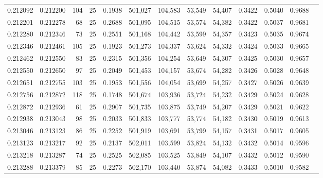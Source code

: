 \begin{tabular}{rrrrrrrrrrrrr}
0.212092 & 0.212200 &   104 &  25 &                                     0.1938 & 501,027 & 104,583 &  53,549 &  54,407 & 0.3422 & 0.5040 & 0.9688 \\
0.212201 & 0.212278 &    68 &  25 &                                     0.2688 & 501,095 & 104,515 &  53,574 &  54,382 & 0.3422 & 0.5037 & 0.9681 \\
0.212280 & 0.212346 &    73 &  25 &                                     0.2551 & 501,168 & 104,442 &  53,599 &  54,357 & 0.3423 & 0.5035 & 0.9674 \\
0.212346 & 0.212461 &   105 &  25 &                                     0.1923 & 501,273 & 104,337 &  53,624 &  54,332 & 0.3424 & 0.5033 & 0.9665 \\
0.212462 & 0.212550 &    83 &  25 &                                     0.2315 & 501,356 & 104,254 &  53,649 &  54,307 & 0.3425 & 0.5030 & 0.9657 \\
0.212550 & 0.212650 &    97 &  25 &                                     0.2049 & 501,453 & 104,157 &  53,674 &  54,282 & 0.3426 & 0.5028 & 0.9648 \\
0.212651 & 0.212755 &   103 &  25 &                                     0.1953 & 501,556 & 104,054 &  53,699 &  54,257 & 0.3427 & 0.5026 & 0.9639 \\
0.212756 & 0.212872 &   118 &  25 &                                     0.1748 & 501,674 & 103,936 &  53,724 &  54,232 & 0.3429 & 0.5024 & 0.9628 \\
0.212872 & 0.212936 &    61 &  25 &                                     0.2907 & 501,735 & 103,875 &  53,749 &  54,207 & 0.3429 & 0.5021 & 0.9622 \\
0.212938 & 0.213043 &    98 &  25 &                                     0.2033 & 501,833 & 103,777 &  53,774 &  54,182 & 0.3430 & 0.5019 & 0.9613 \\
0.213046 & 0.213123 &    86 &  25 &                                     0.2252 & 501,919 & 103,691 &  53,799 &  54,157 & 0.3431 & 0.5017 & 0.9605 \\
0.213123 & 0.213217 &    92 &  25 &                                     0.2137 & 502,011 & 103,599 &  53,824 &  54,132 & 0.3432 & 0.5014 & 0.9596 \\
0.213218 & 0.213287 &    74 &  25 &                                     0.2525 & 502,085 & 103,525 &  53,849 &  54,107 & 0.3432 & 0.5012 & 0.9590 \\
0.213288 & 0.213379 &    85 &  25 &                                     0.2273 & 502,170 & 103,440 &  53,874 &  54,082 & 0.3433 & 0.5010 & 0.9582 \\

\end{tabular}
